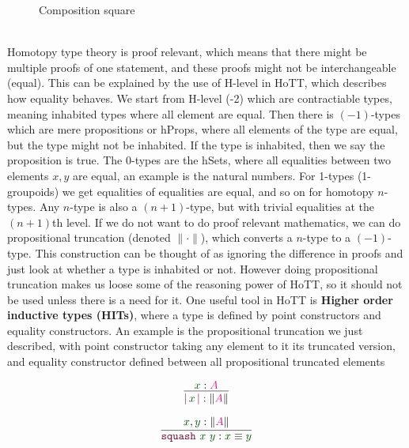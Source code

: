 \documentclass[twoside,11pt,openright]{report}
\theoremstyle{plain} %
\theoremstyle{definition}
\theoremstyle{remark}
\newcommand*{\term}[1]{\textcolor{green!30!black}{#1}} %
\newcommand*{\type}[1]{\textcolor{magenta!90!black}{#1}}
\newcommand*{\constructor}[1]{\textcolor{purple!60!black}{\ensuremath{\mathtt{#1}}}}
\newcommand{\ct}{%
  \mathchoice{\mathbin{\raisebox{0.5ex}{$\displaystyle\centerdot$}}}%
             {\mathbin{\raisebox{0.5ex}{$\centerdot$}}}%
             {\mathbin{\raisebox{0.25ex}{$\scriptstyle\,\centerdot\,$}}}%
             {\mathbin{\raisebox{0.1ex}{$\scriptscriptstyle\,\centerdot\,$}}}
}
\begin{document}
\begin{figure}[h]
  \centering
  \caption{Composition square}
  \label{fig:cubical-composition-square}
\end{figure}
\\ 
Homotopy type theory is proof relevant, which means that there might be multiple proofs of one statement, and these proofs might not be interchangeable (equal). This can be explained by the use of H-level in HoTT, which describes how equality behaves. We start from H-level (-2) which are contractiable types, meaning inhabited types where all element are equal. Then there is \((-1)\)-types which are mere propositions or hProps, where all elements of the type are equal, but the type might not be inhabited. If the type is inhabited, then we say the proposition is true. The 0-types are the hSets, where all equalities between two elements \(x,y\) are equal, an example is the natural numbers. For 1-types (1-groupoids) we get equalities of equalities are equal, and so on for homotopy \(n\)-types. Any \(n\)-type is also a \((n+1)\)-type, but with trivial equalities at the \((n+1)\)th level. If we do not want to do proof relevant mathematics, we can do propositional truncation (denoted \(\|{\cdot}\|\)), which converts a \(n\)-type to a \((-1)\)-type. This construction can be thought of as ignoring the difference in proofs and just look at whether a type is inhabited or not. However doing propositional truncation makes us loose some of the reasoning power of HoTT, so it should not be used unless there is a need for it. One useful tool in HoTT is \textbf{Higher order inductive types (HITs)}, where a type is defined by point constructors and equality constructors. An example is the propositional truncation we just described, with point constructor taking any element to it its truncated version, and equality constructor defined between all propositional truncated elements\\[-9mm]
\begin{center}
  \strut
  \hfill
  \begin{minipage}[b]{0.25\linewidth}
    \begin{equation}
      \vcenter{\infer{\constructor{|}\,\term{x}\,\constructor{|} : \| \type{A} \|}{\term{x} : \type{A}}}
    \end{equation}
  \end{minipage}
  \hfill
  \begin{minipage}[b]{0.3\linewidth}
    \begin{equation}
      \vcenter{\infer{\constructor{squash}~\term{x}~\term{y} : \term{x} \equiv \term{y}}{\term{x}, \term{y} : \|\type{A}\|}}
    \end{equation}
  \end{minipage}
  \hfill
  \strut
\end{center}
\end{document}
